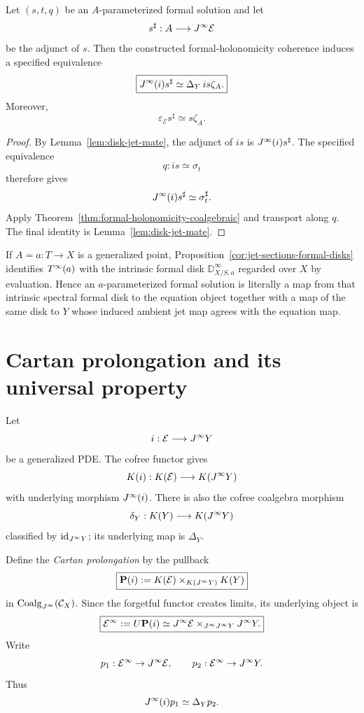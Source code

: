 \begin{proposition}
\label{prop:formal-solution-adjoint}
Let $(s,t,q)$ be an $A$-parameterized formal solution and let
\[
    s^\sharp:A\longrightarrow J^{\infty}\mathcal E
\]
be the adjunct of $s$.  Then the constructed formal-holonomicity coherence induces a specified equivalence
\[
\boxed{
    J^{\infty}(i)s^\sharp
    \simeq
    \Delta_Y\,is\zeta_A.
}
\]
Moreover,
\[
    \varepsilon_{\mathcal E}s^\sharp\simeq s\zeta_A.
\]
\end{proposition}

\begin{proof}
By Lemma~\ref{lem:disk-jet-mate}, the adjunct of $is$ is $J^{\infty}(i)s^\sharp$.  The specified equivalence
\[
    q:is\simeq\sigma_t
\]
therefore gives
\[
    J^{\infty}(i)s^\sharp\simeq\sigma_t^\sharp.
\]
Apply Theorem~\ref{thm:formal-holonomicity-coalgebraic} and transport along $q$.  The final identity is Lemma~\ref{lem:disk-jet-mate}.
\end{proof}

\begin{remark}
If $A=a:T\to X$ is a generalized point, Proposition~\ref{cor:jet-sections-formal-disks} identifies $T^{\infty}(a)$ with the intrinsic formal disk $\mathbb D^\infty_{X/S,a}$ regarded over $X$ by evaluation.  Hence an $a$-parameterized formal solution is literally a map from that intrinsic spectral formal disk to the equation object together with a map of the same disk to $Y$ whose induced ambient jet map agrees with the equation map.
\end{remark}

\section{Cartan prolongation and its universal property}
\label{sec:pde-prolongation}

\begin{construction}
\label{con:pde-prolongation}
Let
\[
    i:\mathcal E\longrightarrow J^{\infty} Y
\]
be a generalized PDE.  The cofree functor gives
\[
    K(i):K(\mathcal E)\longrightarrow K(J^{\infty} Y)
\]
with underlying morphism $J^{\infty}(i)$.  There is also the cofree coalgebra morphism
\[
    \delta_Y:K(Y)\longrightarrow K(J^{\infty} Y)
\]
classified by $\operatorname{id}_{J^{\infty} Y}$; its underlying map is $\Delta_Y$.

Define the \emph{Cartan prolongation} by the pullback
\[
\boxed{
    \mathbf P(i)
    :=
    K(\mathcal E)
    \times_{K(J^{\infty} Y)}
    K(Y)
}
\]
in $\operatorname{Coalg}_{J^{\infty}}(\mathcal C_X)$.  Since the forgetful functor creates limits, its underlying object is
\[
\boxed{
    \mathcal E^\infty
    :=
    U\mathbf P(i)
    \simeq
    J^{\infty}\mathcal E
    \times_{J^{\infty}J^{\infty} Y}
    J^{\infty} Y.
}
\]
Write
\[
    p_1:\mathcal E^\infty\to J^{\infty}\mathcal E,
    \qquad
    p_2:\mathcal E^\infty\to J^{\infty} Y.
\]
Thus
\[
    J^{\infty}(i)p_1\simeq\Delta_Yp_2.
\]
\end{construction}

